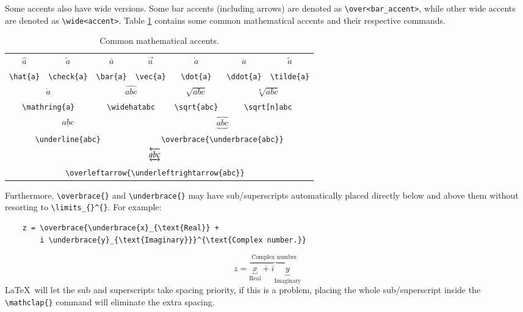 Some accents also have wide versions. Some bar accents (including arrows) are denoted as
\verb|\over<bar_accent>|, while other wide accents are denoted as \verb|\wide<accent>|. Table \ref{t:ma} contains some common mathematical accents and their respective commands.
\begin{table}[!htbp]
    \centering
    \caption{Common mathematical accents.}
    \label{t:ma}
    \begin{tabular}{ccccccc}
        $\hat{a}$ & $\check{a}$ & $\bar{a}$ & $\vec{a}$ & $\dot{a}$ & $\ddot{a}$ & $\tilde{a}$ \\
        \verb|\hat{a}| & \verb|\check{a}| & \verb|\bar{a}| & \verb|\vec{a}| & \verb|\dot{a}| & \verb|\ddot{a}| & \verb|\tilde{a}| \\
        \multicolumn{2}{c}{$\mathring{a}$} & \multicolumn{2}{c}{$\widehat{abc}$} & $\sqrt{abc}$ & \multicolumn{2}{c}{$\sqrt[n]{abc}$} \\
        \multicolumn{2}{c}{\texttt{\textbackslash mathring\{a\}}} & \multicolumn{2}{c}{\texttt{\textbackslash widehat{abc}}} & \verb|\sqrt{abc}| & \multicolumn{2}{c}{\texttt{\textbackslash sqrt[n]{abc}}} \\
        \multicolumn{3}{c}{$\underline{abc}$} & \multicolumn{4}{c}{$\overbrace{\underbrace{abc}}$} \\
        \multicolumn{3}{c}{\texttt{\textbackslash underline\{abc\}}} & \multicolumn{4}{c}{\texttt{\textbackslash overbrace\{\textbackslash underbrace\{abc\}\}}} \\
        & \multicolumn{5}{c}{$\overleftarrow{\underleftrightarrow{abc}}$} & \\
        & \multicolumn{5}{c}{\texttt{\textbackslash overleftarrow\{\textbackslash underleftrightarrow\{abc\}\}}} & \\
    \end{tabular}
\end{table}

Furthermore, \verb|\overbrace{}| and \verb|\underbrace{}| may have sub/superscripts automatically placed directly below and above them without resorting to \verb|\limits_{}^{}|. For example:
\begin{verbatim}
	z = \overbrace{\underbrace{x}_{\text{Real}} + 
	    i \underbrace{y}_{\text{Imaginary}}}^{\text{Complex number.}}
\end{verbatim}
\[z = \overbrace{\underbrace{x}_{\text{Real}} + i \underbrace{y}_{\text{Imaginary}}}^{\text{Complex number.}}\]
\LaTeX~will let the sub and superscripts take spacing priority, if this is a problem, placing the whole sub/superscript inside the \verb|\mathclap{}| command will eliminate the extra spacing.
%
